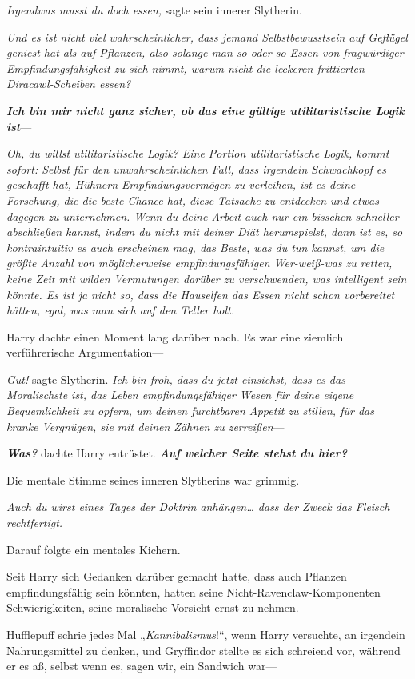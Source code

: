 {\emph{Irgendwas musst du doch essen,} sagte sein innerer Slytherin.

\emph{Und es ist nicht viel wahrscheinlicher, dass jemand Selbstbewusstsein auf Geflügel geniest hat als auf Pflanzen, also solange man so oder so Essen von fragwürdiger Empfindungsfähigkeit zu sich nimmt, warum nicht die leckeren frittierten Diracawl-Scheiben essen?}

\textbf{\emph{Ich bin mir nicht ganz sicher, ob das eine gültige utilitaristische Logik ist}}—

\emph{Oh, du willst utilitaristische Logik? Eine Portion utilitaristische Logik, kommt sofort: Selbst für den unwahrscheinlichen Fall, dass irgendein Schwachkopf es geschafft hat, Hühnern Empfindungsvermögen zu verleihen, ist es deine Forschung, die die beste Chance hat, diese Tatsache zu entdecken und etwas dagegen zu unternehmen. Wenn du deine Arbeit auch nur ein bisschen schneller abschließen kannst, indem du nicht mit deiner Diät herumspielst, dann ist es, so kontraintuitiv es auch erscheinen mag, das Beste, was du tun kannst, um die größte Anzahl von möglicherweise empfindungsfähigen Wer-weiß-was zu retten, keine Zeit mit wilden Vermutungen darüber zu verschwenden, was intelligent sein könnte. Es ist ja nicht so, dass die Hauselfen das Essen nicht schon vorbereitet hätten, egal, was man sich auf den Teller holt.}

Harry dachte einen Moment lang darüber nach. Es war eine ziemlich verführerische Argumentation—

\emph{Gut!} sagte Slytherin. \emph{Ich bin froh, dass du jetzt einsiehst, dass es das Moralischste ist, das Leben empfindungsfähiger Wesen für deine eigene Bequemlichkeit zu opfern, um deinen furchtbaren Appetit zu stillen, für das kranke Vergnügen, sie mit deinen Zähnen zu zerreißen}—

\textbf{\emph{Was?}} dachte Harry entrüstet. \textbf{\emph{Auf welcher Seite stehst du hier?}}

Die mentale Stimme seines inneren Slytherins war grimmig.

\emph{Auch du wirst eines Tages der Doktrin anhängen… dass der Zweck das Fleisch rechtfertigt.}

Darauf folgte ein mentales Kichern.

Seit Harry sich Gedanken darüber gemacht hatte, dass auch Pflanzen empfindungsfähig sein könnten, hatten seine Nicht-Ravenclaw-Komponenten Schwierigkeiten, seine moralische Vorsicht ernst zu nehmen.

Hufflepuff schrie jedes Mal „\emph{Kannibalismus}!“, wenn Harry versuchte, an irgendein Nahrungsmittel zu denken, und Gryffindor stellte es sich schreiend vor, während er es aß, selbst wenn es, sagen wir, ein Sandwich war—

}
